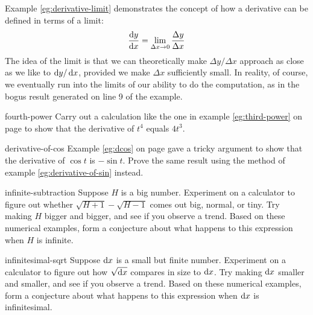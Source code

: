 Example \ref{eg:derivative-limit} demonstrates the concept of how a derivative can be
defined in terms of a limit:
\begin{equation*}
  \frac{\operatorname{d\!} y}{\operatorname{d\!} x} = \lim_{\Delta x\rightarrow 0} \frac{\Delta y}{\Delta x}
\end{equation*}
The idea of the limit is that we can theoretically make $\Delta y/\Delta x$ approach
as close as we like to $\operatorname{d\!} y/\operatorname{d\!} x$, provided we make $\Delta x$ sufficiently small.
In reality, of course, we eventually run into the limits of our ability to do the
computation, as in the bogus result generated on line 9 of the example.





\begin{hwsection}

\begin{hwwithsoln}{fourth-power}
Carry out a calculation like the one in example \ref{eg:third-power} on page \pageref{eg:third-power} to
show that the derivative of $t^4$ equals $4t^3$.
\end{hwwithsoln}

\begin{hwwithsoln}{derivative-of-cos}
Example \ref{eg:dcos} on page \pageref{eg:dcos} gave a tricky argument to show that the derivative of
$\cos t$ is $-\sin t$. Prove the same result using the method of example \ref{eg:derivative-of-sin} instead.
\end{hwwithsoln}

\begin{hwwithsoln}{infinite-subtraction}
Suppose $H$ is a big number. Experiment on a calculator to figure out whether $\sqrt{H+1}-\sqrt{H-1}$
comes out big, normal, or tiny. Try making $H$ bigger and bigger, and see if you observe a trend.
Based on these numerical examples, form a conjecture about what happens to this expression when $H$ is infinite.
\end{hwwithsoln}

\begin{hwwithsoln}{infinitesimal-sqrt}
Suppose $\operatorname{d\!} x$ is a small but finite number. Experiment on a calculator to figure out how $\sqrt{\operatorname{d\!} x}$
compares in size to $\operatorname{d\!} x$.  Try making $\operatorname{d\!} x$ smaller and smaller, and see if you observe a trend.
Based on these numerical examples, form a conjecture about what happens to this expression when $\operatorname{d\!} x$ is
infinitesimal.
\end{hwwithsoln}


\end{hwsection}
